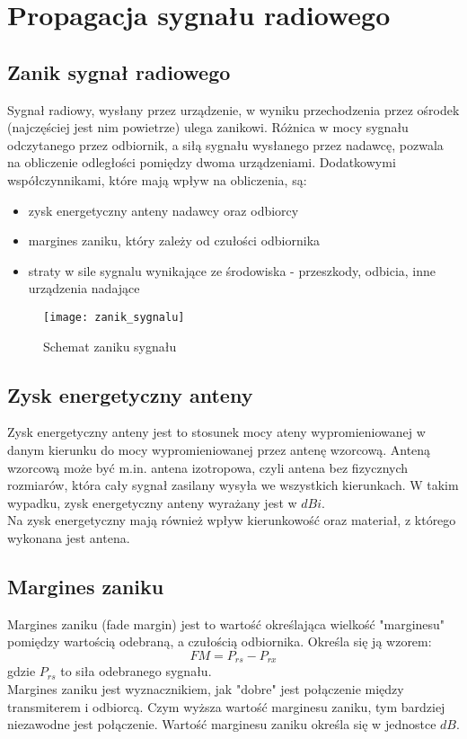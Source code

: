 \chapter{Propagacja sygnału radiowego}
\label{cha:teoria}
\section{Zanik sygnał radiowego}
Sygnał radiowy, wysłany przez urządzenie, w wyniku przechodzenia przez ośrodek (najczęściej jest nim powietrze) ulega zanikowi. Różnica w mocy sygnału odczytanego przez odbiornik, a siłą sygnału wysłanego przez nadawcę, pozwala na obliczenie odległości pomiędzy dwoma urządzeniami. Dodatkowymi współczynnikami, które mają wpływ na obliczenia, są:
\begin{itemize}
	\item zysk energetyczny anteny nadawcy oraz odbiorcy
	\item margines zaniku, który zależy od czułości odbiornika
	\item straty w sile sygnalu wynikające ze środowiska - przeszkody, odbicia, inne urządzenia nadające
\end{itemize}
\begin{figure}[H]			
	\centering
	\caption{Schemat zaniku sygnału}
	\texttt{[image: zanik\_sygnalu]}
\end{figure}
\section{Zysk energetyczny anteny}
Zysk energetyczny anteny jest to stosunek mocy ateny wypromieniowanej w danym kierunku do mocy wypromieniowanej przez antenę wzorcową. Anteną wzorcową może być m.in. antena izotropowa, czyli antena bez fizycznych rozmiarów, która cały sygnał zasilany wysyła we wszystkich kierunkach. W takim wypadku, zysk energetyczny anteny wyrażany jest w $dBi$.\\
Na zysk energetyczny mają również wpływ kierunkowość oraz materiał, z którego wykonana jest antena.
\section{Margines zaniku}
Margines zaniku (fade margin) jest to wartość określająca wielkość "marginesu" pomiędzy wartością odebraną, a czułością odbiornika. Określa się ją wzorem:
\begin{equation}
FM = P_{rs} - P_{rx}
\end{equation}
gdzie $P_{rs}$ to siła odebranego sygnału.\\
Margines zaniku jest wyznacznikiem, jak "dobre" jest połączenie między transmiterem i odbiorcą. Czym wyższa wartość marginesu zaniku, tym bardziej niezawodne jest połączenie.
Wartość marginesu zaniku określa się w jednostce $dB$.
